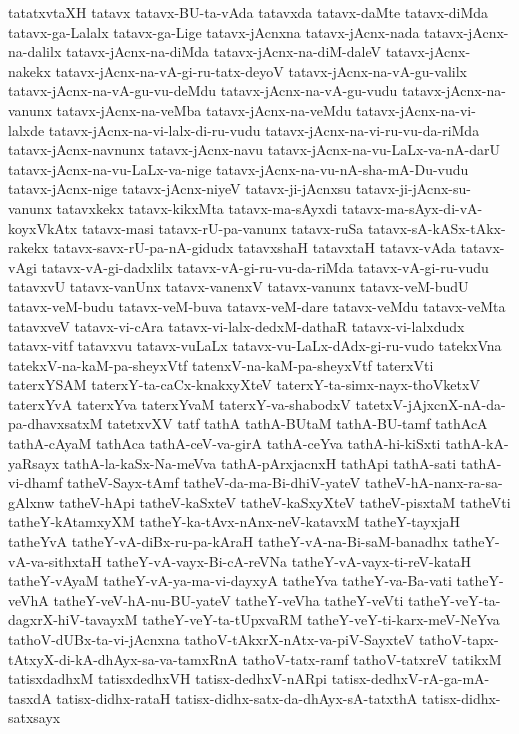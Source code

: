 {tatatxvtaXH
tatavx
tatavx-BU-ta-vAda
tatavxda
tatavx-daMte
tatavx-diMda
tatavx-ga-Lalalx
tatavx-ga-Lige
tatavx-jAcnxna
tatavx-jAcnx-nada
tatavx-jAcnx-na-dalilx
tatavx-jAcnx-na-diMda
tatavx-jAcnx-na-diM-daleV
tatavx-jAcnx-nakekx
tatavx-jAcnx-na-vA-gi-ru-tatx-deyoV
tatavx-jAcnx-na-vA-gu-valilx
tatavx-jAcnx-na-vA-gu-vu-deMdu
tatavx-jAcnx-na-vA-gu-vudu
tatavx-jAcnx-na-vanunx
tatavx-jAcnx-na-veMba
tatavx-jAcnx-na-veMdu
tatavx-jAcnx-na-vi-lalxde
tatavx-jAcnx-na-vi-lalx-di-ru-vudu
tatavx-jAcnx-na-vi-ru-vu-da-riMda
tatavx-jAcnx-navnunx
tatavx-jAcnx-navu
tatavx-jAcnx-na-vu-LaLx-va-nA-darU
tatavx-jAcnx-na-vu-LaLx-va-nige
tatavx-jAcnx-na-vu-nA-sha-mA-Du-vudu
tatavx-jAcnx-nige
tatavx-jAcnx-niyeV
tatavx-ji-jAcnxsu
tatavx-ji-jAcnx-su-vanunx
tatavxkekx
tatavx-kikxMta
tatavx-ma-sAyxdi
tatavx-ma-sAyx-di-vA-koyxVkAtx
tatavx-masi
tatavx-rU-pa-vanunx
tatavx-ruSa
tatavx-sA-kASx-tAkx-rakekx
tatavx-savx-rU-pa-nA-gidudx
tatavxshaH
tatavxtaH
tatavx-vAda
tatavx-vAgi
tatavx-vA-gi-dadxlilx
tatavx-vA-gi-ru-vu-da-riMda
tatavx-vA-gi-ru-vudu
tatavxvU
tatavx-vanUnx
tatavx-vanenxV
tatavx-vanunx
tatavx-veM-budU
tatavx-veM-budu
tatavx-veM-buva
tatavx-veM-dare
tatavx-veMdu
tatavx-veMta
tatavxveV
tatavx-vi-cAra
tatavx-vi-lalx-dedxM-dathaR
tatavx-vi-lalxdudx
tatavx-vitf
tatavxvu
tatavx-vuLaLx
tatavx-vu-LaLx-dAdx-gi-ru-vudo
tatekxVna
tatekxV-na-kaM-pa-sheyxVtf
tatenxV-na-kaM-pa-sheyxVtf
taterxVti
taterxYSAM
taterxY-ta-caCx-knakxyXteV
taterxY-ta-simx-nayx-thoVketxV
taterxYvA
taterxYva
taterxYvaM
taterxY-va-shabodxV
tatetxV-jAjxcnX-nA-da-pa-dhavxsatxM
tatetxvXV
tatf
tathA
tathA-BUtaM
tathA-BU-tamf
tathAcA
tathA-cAyaM
tathAca
tathA-ceV-va-girA
tathA-ceYva
tathA-hi-kiSxti
tathA-kA-yaRsayx
tathA-la-kaSx-Na-meVva
tathA-pArxjacnxH
tathApi
tathA-sati
tathA-vi-dhamf
tatheV-Sayx-tAmf
tatheV-da-ma-Bi-dhiV-yateV
tatheV-hA-nanx-ra-sa-gAlxnw
tatheV-hApi
tatheV-kaSxteV
tatheV-kaSxyXteV
tatheV-pisxtaM
tatheVti
tatheY-kAtamxyXM
tatheY-ka-tAvx-nAnx-neV-katavxM
tatheY-tayxjaH
tatheYvA
tatheY-vA-diBx-ru-pa-kAraH
tatheY-vA-na-Bi-saM-banadhx
tatheY-vA-va-sithxtaH
tatheY-vA-vayx-Bi-cA-reVNa
tatheY-vA-vayx-ti-reV-kataH
tatheY-vAyaM
tatheY-vA-ya-ma-vi-dayxyA
tatheYva
tatheY-va-Ba-vati
tatheY-veVhA
tatheY-veV-hA-nu-BU-yateV
tatheY-veVha
tatheY-veVti
tatheY-veY-ta-dagxrX-hiV-tavayxM
tatheY-veY-ta-tUpxvaRM
tatheY-veY-ti-karx-meV-NeYva
tathoV-dUBx-ta-vi-jAcnxna
tathoV-tAkxrX-nAtx-va-piV-SayxteV
tathoV-tapx-tAtxyX-di-kA-dhAyx-sa-va-tamxRnA
tathoV-tatx-ramf
tathoV-tatxreV
tatikxM
tatisxdadhxM
tatisxdedhxVH
tatisx-dedhxV-nARpi
tatisx-dedhxV-rA-ga-mA-tasxdA
tatisx-didhx-rataH
tatisx-didhx-satx-da-dhAyx-sA-tatxthA
tatisx-didhx-satxsayx
}

